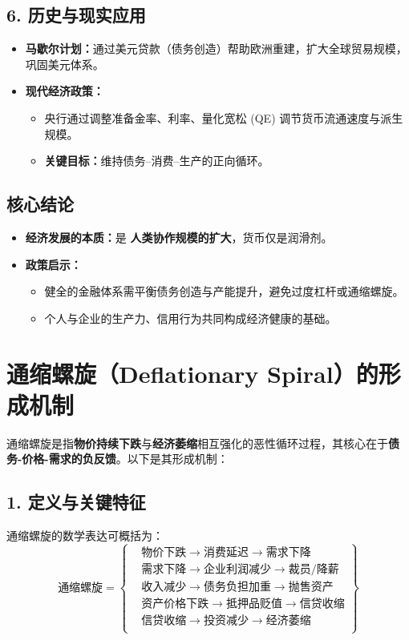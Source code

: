 \subsection*{6. 历史与现实应用}
\begin{itemize}[leftmargin=*, nosep]
  \item \textbf{马歇尔计划：}通过美元贷款（债务创造）帮助欧洲重建，扩大全球贸易规模，巩固美元体系。
  \item \textbf{现代经济政策：}
    \begin{itemize}
      \item 央行通过调整准备金率、利率、量化宽松 (QE) 调节货币流通速度与派生规模。
      \item \textbf{关键目标：}维持债务--消费--生产的正向循环。
    \end{itemize}
\end{itemize}

\subsection*{核心结论}
\begin{itemize}[leftmargin=*, nosep]
  \item \textbf{经济发展的本质：}是 \textbf{人类协作规模的扩大}，货币仅是润滑剂。
  \item \textbf{政策启示：}
    \begin{itemize}
      \item 健全的金融体系需平衡债务创造与产能提升，避免过度杠杆或通缩螺旋。
      \item 个人与企业的生产力、信用行为共同构成经济健康的基础。
    \end{itemize}
\end{itemize}


\usetikzlibrary{arrows,positioning}


\section{通缩螺旋（Deflationary Spiral）的形成机制}

通缩螺旋是指\textbf{物价持续下跌}与\textbf{经济萎缩}相互强化的恶性循环过程，其核心在于\textbf{债务-价格-需求的负反馈}。以下是其形成机制：

\subsection*{1. 定义与关键特征}
通缩螺旋的数学表达可概括为：
$$
\text{通缩螺旋} = \left\{ \begin{aligned}
&\text{物价下跌} \rightarrow \text{消费延迟} \rightarrow \text{需求下降} \\
&\text{需求下降} \rightarrow \text{企业利润减少} \rightarrow \text{裁员/降薪} \\
&\text{收入减少} \rightarrow \text{债务负担加重} \rightarrow \text{抛售资产} \\
&\text{资产价格下跌} \rightarrow \text{抵押品贬值} \rightarrow \text{信贷收缩} \\
&\text{信贷收缩} \rightarrow \text{投资减少} \rightarrow \text{经济萎缩} \\
\end{aligned}
 \right\}
$$

